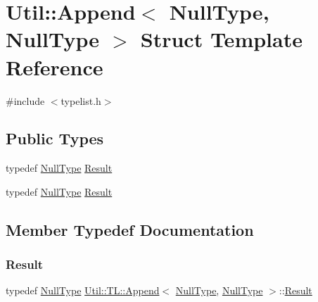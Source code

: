 \hypertarget{structUtil_1_1TL_1_1Append_3_01NullType_00_01NullType_01_4}{}\section{Util\+:\+:Append$<$ Null\+Type, Null\+Type $>$ Struct Template Reference}
\label{structUtil_1_1TL_1_1Append_3_01NullType_00_01NullType_01_4}


{\ttfamily \#include $<$typelist.\+h$>$}

\subsection*{Public Types}
\begin{DoxyCompactItemize}
\item 
typedef \mbox{\hyperlink{classUtil_1_1NullType}{Null\+Type}} \mbox{\hyperlink{structUtil_1_1TL_1_1Append_3_01NullType_00_01NullType_01_4_adc4800f4356ff026fe01fbcb9e2ce62f}{Result}}
\item 
typedef \mbox{\hyperlink{classUtil_1_1NullType}{Null\+Type}} \mbox{\hyperlink{structUtil_1_1TL_1_1Append_3_01NullType_00_01NullType_01_4_adc4800f4356ff026fe01fbcb9e2ce62f}{Result}}
\end{DoxyCompactItemize}


\subsection{Member Typedef Documentation}
\mbox{\label{structUtil_1_1TL_1_1Append_3_01NullType_00_01NullType_01_4_adc4800f4356ff026fe01fbcb9e2ce62f}} 
\subsubsection{\texorpdfstring{Result}{Result}\hspace{0.1cm}{\footnotesize\ttfamily [1/2]}}
{\footnotesize\ttfamily typedef \mbox{\hyperlink{classUtil_1_1NullType}{Null\+Type}} \mbox{\hyperlink{structUtil_1_1TL_1_1Append}{Util\+::\+T\+L\+::\+Append}}$<$ \mbox{\hyperlink{classUtil_1_1NullType}{Null\+Type}}, \mbox{\hyperlink{classUtil_1_1NullType}{Null\+Type}} $>$\+::\mbox{\hyperlink{structUtil_1_1TL_1_1Append_3_01NullType_00_01NullType_01_4_adc4800f4356ff026fe01fbcb9e2ce62f}{Result}}}

